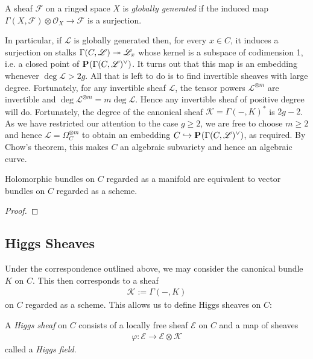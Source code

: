 \documentclass[12pt]{ociamthesis}  %
\begin{document}
\begin{definition}
  A sheaf $\mathscr F$ on a ringed space $X$ is
  \emph{globally generated} if the induced map
  $\Gamma(X,\mathscr F) \otimes \mathscr O_X \to \mathscr F$
  is a surjection.
\end{definition}

In particular, if $\mathscr L$ is globally generated then,
for every $x\in C$, it induces a surjection on stalks
$\Gamma(C,\mathscr L) \twoheadrightarrow \mathscr L_x$ whose kernel is a
subspace of codimension 1, i.e. a closed point of
$\mathbf{P}^{}_{}(\Gamma(C,\mathscr L)^\vee)$. It turns out that this map
is an embedding 
whenever $\deg\mathscr L > 2g$. \cite[Proposition 2.14]{harris2011}
All that is left to do is to find invertible sheaves with large
degree. Fortunately, for any invertible sheaf $\mathscr L$,
the tensor powers $\mathscr L^{\otimes m}$ are invertible and
$\deg\mathscr L^{\otimes m} = m\deg\mathscr L$. Hence any invertible
sheaf of positive degree will do. Fortunately, the degree of
the canonical sheaf $\mathscr K=\Gamma(-,K)^*$ is $2g-2$. As we have restricted
our attention to the case $g\geq 2$, we are free to choose
$m\geq 2$ and hence $\mathscr L = \Omega_C^{\otimes m}$ to obtain
an embedding $C\hookrightarrow\mathbf{P}^{}_{}(\Gamma(C,\mathscr L)^\vee)$, as
required.
By Chow's theorem, this makes $C$ an algebraic subvariety
and hence an algebraic curve.

\begin{lemma}
  Holomorphic bundles on $C$ regarded as a manifold are equivalent
  to vector bundles on $C$ regarded as a scheme.
  \begin{proof}
    \missingproof
  \end{proof}
\end{lemma}

\subsection{Higgs Sheaves}

Under the correspondence outlined above, we may consider the canonical
bundle $K$ on $C$. This then corresponds to a sheaf
\begin{align*}
  \mathscr K := \Gamma(-,K)
\end{align*}
on $C$ regarded as a scheme. This allows us to define Higgs
sheaves on $C$:

\begin{definition}
  A \emph{Higgs sheaf} on $C$ consists of a locally free sheaf
  $\mathscr E$ on $C$ and a map of sheaves
  \begin{align*}
    \varphi : \mathscr E \to \mathscr E \otimes \mathscr K
  \end{align*}
  called a \emph{Higgs field}.
\end{definition}
\end{document}
